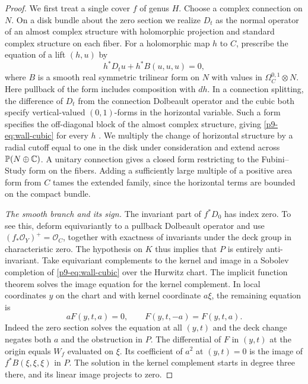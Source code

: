 \begin{proof}
We first treat a single cover $f$ of genus $H$. Choose a complex
connection on $N$. On a disk bundle about the zero section we realize
$D_t$ as the normal operator of an almost complex structure with
holomorphic projection and standard complex structure on each fiber.
For a holomorphic map $h$ to $C$, prescribe the equation of a lift
$(h,u)$ by
\begin{equation}\label{p9-eq:wall-cubic}
 h^*D_t u+h^*B(u,u,u)=0 ,
\end{equation}
where $B$ is a smooth real symmetric trilinear form on $N$ with
values in $\Omega_C^{0,1}\otimes N$. Here pullback of the form includes
composition with $dh$. In a connection splitting, the difference of
$D_t$ from the connection Dolbeault operator and the cubic both specify
vertical-valued $(0,1)$-forms in the horizontal variable. Such a form
specifies the off-diagonal block of the almost complex structure, giving
\eqref{p9-eq:wall-cubic} for every $h$ \cite[Lemma~5.9]{bai}. We multiply
the change of horizontal structure by a radial cutoff equal to one in
the disk under consideration and extend across $\mathbb P(N\oplus\mathbb C)$.
A unitary connection gives a closed form restricting to the
Fubini--Study form on the fibers. Adding a sufficiently large multiple
of a positive area form from $C$ tames the extended family, since the
horizontal terms are bounded on the compact bundle.

\smallskip
\noindent\emph{The smooth branch and its sign.}
The invariant part of $f^*D_0$ has index zero. To see this, deform
equivariantly to a pullback Dolbeault operator and use
$(f_*\mathcal O_Y)^+=\mathcal O_C$, together with exactness of
invariants under the deck group in characteristic zero. The hypothesis
on $K$ thus implies that $P$ is entirely anti-invariant. Take
equivariant complements to the kernel and image in a Sobolev completion
of \eqref{p9-eq:wall-cubic} over the Hurwitz chart. The implicit function
theorem solves the image equation for the kernel complement. In local
coordinates $y$ on the chart and with kernel coordinate $a\xi$, the
remaining equation is
\[
                    a F(y,t,a)=0,\qquad F(y,t,-a)=F(y,t,a).
\]
Indeed the zero section solves the equation at all $(y,t)$ and the
deck change negates both $a$ and the obstruction in $P$. The
differential of $F$ in $(y,t)$ at the origin equals $W_f$ evaluated
on $\xi$. Its coefficient of $a^2$ at $(y,t)=0$ is the image of
$f^*B(\xi,\xi,\xi)$ in $P$. The solution in the kernel complement
starts in degree three there, and its linear image projects to zero.


\end{proof}

